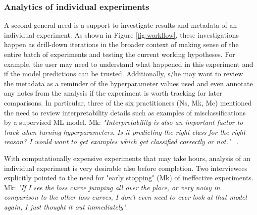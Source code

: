 \documentclass[preprint]{vgtc}        %
\begin{document}
\subsubsection{Analytics of individual experiments}
A second general need is a support to investigate results and metadata of an individual experiment. As shown in Figure \ref{fig:workflow}, these investigations happen as drill-down iterations in the broader context of making sense of the entire batch of experiments and testing the current working hypotheses. 
For example, the user may need to understand what happened in this experiment and if the model predictions can be trusted. Additionally, s/he may want to review the metadata as a reminder of the hyperparameter values used and even annotate any notes from the analysis if the experiment is worth tracking for later comparisons. In particular, three of the six practitioners (Ns, Mk, Mc) mentioned the need to review interpretability details such as examples of misclassifications by a supervised ML model. Mk: \textit{"Interpretability is also an important factor to track when turning hyperparameters. Is it predicting the right class for the right reason? I would want to get examples which get classified correctly or not."} ~\cite{Ribeiro2016quotWhyYouquot}.

With computationally expensive experiments that may take hours, analysis of an individual experiment is very desirable also before completion. Two interviewees explicitly pointed to the need for "early stopping" (Mk) of ineffective experiments. Mk: \textit{"If I see the loss curve jumping all over the place, or very noisy in comparison to the other loss curves, I don't even need to ever look at that model again, I just thought it out immediately"}.
\end{document}
